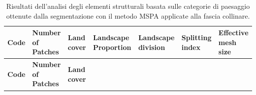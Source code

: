 \documentclass[
]{book}
\begin{document}
\begin{longtable}[]{@{}
  >{\raggedright\arraybackslash}p{}
  >{\raggedright\arraybackslash}p{}
  >{\raggedright\arraybackslash}p{}
  >{\raggedright\arraybackslash}p{}
  >{\raggedright\arraybackslash}p{}
  >{\raggedright\arraybackslash}p{}
  >{\raggedright\arraybackslash}p{}@{}}
\caption{\label{tab:mspaCollina} Risultati dell'analisi degli elementi strutturali basata sulle categorie di paesaggio ottenute dalla segmentazione con il metodo MSPA applicate alla fascia collinare.}\tabularnewline
\toprule\noalign{}
\begin{minipage}[b]{\linewidth}\raggedright
\textbf{Code}
\end{minipage} & \begin{minipage}[b]{\linewidth}\raggedright
\textbf{Number of Patches}
\end{minipage} & \begin{minipage}[b]{\linewidth}\raggedright
\textbf{Land cover}
\end{minipage} & \begin{minipage}[b]{\linewidth}\raggedright
\textbf{Landscape Proportion}
\end{minipage} & \begin{minipage}[b]{\linewidth}\raggedright
\textbf{Landscape division}
\end{minipage} & \begin{minipage}[b]{\linewidth}\raggedright
\textbf{Splitting index}
\end{minipage} & \begin{minipage}[b]{\linewidth}\raggedright
\textbf{Effective mesh size}
\end{minipage} \\
\midrule\noalign{}
\endfirsthead
\toprule\noalign{}
\begin{minipage}[b]{\linewidth}\raggedright
\textbf{Code}
\end{minipage} & \begin{minipage}[b]{\linewidth}\raggedright
\textbf{Number of Patches}
\end{minipage} & \begin{minipage}[b]{\linewidth}\raggedright
\textbf{Land cover}
\end{minipage} & \begin{minipage}[b]{\linewidth}\raggedright

\end{minipage}
\end{longtable}
\end{document}
